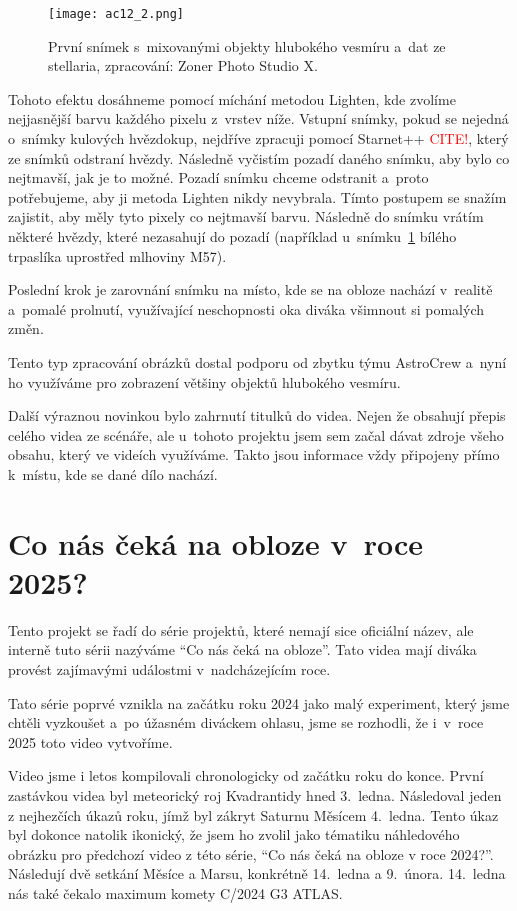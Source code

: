 \documentclass[12pt,a4paper,titlepage]{article}
\newcommand{\todo}[1]{\textcolor{red}{#1}}
\begin{document}
\begin{figure}[H]
	\centering
	\texttt{[image: ac12\_2.png]}
	\caption{První snímek s~mixovanými objekty hlubokého vesmíru a~dat ze stellaria, zpracování: Zoner Photo Studio X.}\label{prac:ac12_2}
\end{figure}

Tohoto efektu dosáhneme pomocí míchání metodou Lighten, kde zvolíme nejjasnější barvu každého pixelu z~vrstev níže. Vstupní snímky, pokud se nejedná o~snímky kulových hvězdokup, nejdříve zpracuji pomocí Starnet++ \todo{CITE!}, který ze snímků odstraní hvězdy. Následně vyčistím pozadí daného snímku, aby bylo co nejtmavší, jak je to možné. Pozadí snímku chceme odstranit a~proto potřebujeme, aby ji metoda Lighten nikdy nevybrala. Tímto postupem se snažím zajistit, aby měly tyto pixely co nejtmavší barvu. Následně do snímku vrátím některé hvězdy, které nezasahují do pozadí (například u~snímku~\ref{prac:ac12_2} bílého trpaslíka uprostřed mlhoviny M57).

Poslední krok je zarovnání snímku na místo, kde se na obloze nachází v~realitě a~pomalé prolnutí, využívající neschopnosti oka diváka všimnout si pomalých změn.

Tento typ zpracování obrázků dostal podporu od zbytku týmu AstroCrew a~nyní ho využíváme pro zobrazení většiny objektů hlubokého vesmíru.

Další výraznou novinkou bylo zahrnutí titulků do videa. Nejen že obsahují přepis celého videa ze scénáře, ale u~tohoto projektu jsem sem začal dávat zdroje všeho obsahu, který ve videích využíváme. Takto jsou informace vždy připojeny přímo k~místu, kde se dané dílo nachází.

\section{Co nás čeká na obloze v~roce 2025?}
Tento projekt se řadí do série projektů, které nemají sice oficiální název, ale interně tuto sérii nazýváme \enquote{Co nás čeká na obloze}. Tato videa mají diváka provést zajímavými událostmi v~nadcházejícím roce.

Tato série poprvé vznikla na začátku roku 2024 jako malý experiment, který jsme chtěli vyzkoušet a~po úžasném diváckem ohlasu, jsme se rozhodli, že i~v~roce 2025 toto video vytvoříme.

Video jsme i letos kompilovali chronologicky od začátku roku do konce. První zastávkou videa byl meteorický roj Kvadrantidy hned 3.\ ledna. Následoval jeden z nejhezčích úkazů roku, jímž byl zákryt Saturnu Měsícem 4.\ ledna. Tento úkaz byl dokonce natolik ikonický, že jsem ho zvolil jako tématiku náhledového obrázku pro předchozí video z této série, \enquote{Co nás čeká na obloze v roce 2024?}. Následují dvě setkání Měsíce a Marsu, konkrétně 14.\ ledna a 9.\ února. 14.\ ledna nás také čekalo maximum komety C/2024 G3 ATLAS.\@
\end{document}
